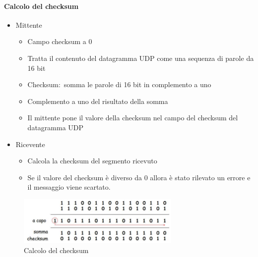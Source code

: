 \paragraph{Calcolo del checksum}

\begin{itemize}
    \item Mittente
          \begin{itemize}
              \item Campo checksum a 0
              \item Tratta il contenuto del datagramma UDP come una sequenza di parole da 16 bit
              \item Checksum:\ somma le parole di 16 bit in complemento a uno
              \item Complemento a uno del risultato della somma
              \item Il mittente pone il valore della checksum nel campo del checksum del datagramma UDP
          \end{itemize}
    \item Ricevente
          \begin{itemize}
              \item Calcola la checksum del segmento ricevuto
              \item Se il valore del checksum è diverso da 0 allora è stato rilevato un errore e il messaggio viene scartato.
          \end{itemize}
\end{itemize}

\begin{figure}[H]
    \centering
    \includegraphics[width=0.7\textwidth]{immagini/Checksum.png}
    \caption*{Calcolo del checksum}
\end{figure}

